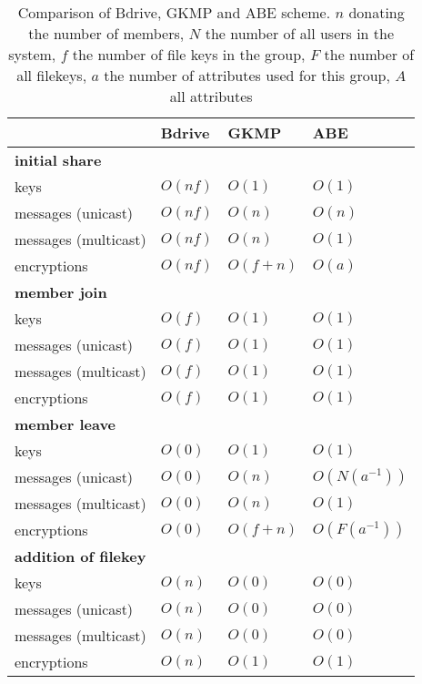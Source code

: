 \begin{table*}[!ht]
\centering
\begin{tabular}{l 		| l 						| l 						| l }
 						& \textbf{Bdrive}			& \textbf{\ac{GKMP}} 			& \textbf{\ac{ABE}} 		\\
\hline
\textbf{initial share} 																				\\
keys 					& $O(nf)$ 					& $O(1)$	 				& $O(1)$			\\
messages (unicast)		& $O(nf)$  					& $O(n)$					& $O(n)$			\\
messages (multicast) 	& $O(nf)$ 					& $O(n)$ 					& $O(1)$			\\
encryptions				& $O(nf)$ 					& $O(f + n)$				& $O(a)$ 			\\
\hline
\textbf{member join} 																				\\
keys 					& $O(f)$   					& $O(1)$					& $O(1)$			\\
messages (unicast)		& $O(f)$  					& $O(1)$  					& $O(1)$ 			\\
messages (multicast) 	& $O(f)$ 	 				& $O(1)$					& $O(1)$ 			\\
encryptions				& $O(f)$  					& $O(1)$					& $O(1)$ 			\\
\hline
\textbf{member leave}																				\\
keys 					& $O(0)$					& $O(1)$					& $O(1)$			\\
messages (unicast)		& $O(0)$					& $O(n)$  					& $O(N(a^{-1}))$	\\
messages (multicast)	& $O(0)$					& $O(n)$					& $O(1)$ 			\\ 
encryptions 			& $O(0)$					& $O(f + n)$ 				& $O(F(a^{-1}))$	\\
\hline	
\textbf{addition of filekey}																		\\
keys 					& $O(n)$	 				& $O(0)$					& $O(0)$			\\
messages (unicast)		& $O(n)$	 				& $O(0)$					& $O(0)$			\\
messages (multicast)	& $O(n)$ 					& $O(0)$ 					& $O(0)$			\\
encryptions				& $O(n)$ 					& $O(1)$					& $O(1)$			\\
\hline
\end{tabular}
\caption{Comparison of Bdrive, \ac{GKMP} and \ac{ABE} scheme. $n$ donating the number of members, $N$ the number of all users in the system, $f$ the number of file keys in the group, $F$ the number of all filekeys, $a$ the number of attributes used for this group, $A$ all attributes }
\label{tab:comparisonsOWFTtoABE}
\end{table*}

